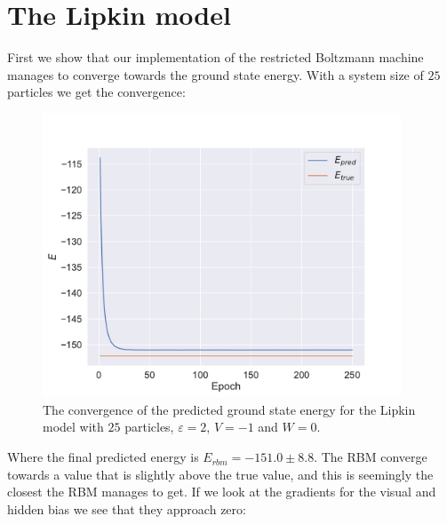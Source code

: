 \section{The Lipkin model}

First we show that our implementation of the restricted Boltzmann machine manages to converge towards the ground state energy. With a system size of $25$ particles we get the convergence:

\begin{figure}[H]
  \begin{center}
    \includegraphics[width=0.95\textwidth]{Figures/Plots/Lipkin/Result25conv.pdf}
  \end{center}
  \caption{The convergence of the predicted ground state energy for the Lipkin model with $25$ particles, $\varepsilon = 2$, $V = -1$ and $W=0$.}\label{fig:res25conv}
\end{figure}

Where the final predicted energy is $E_{rbm} = -151.0 \pm 8.8$. The RBM converge towards a value that is slightly above the true value, and this is seemingly the closest the RBM manages to get. If we look at the gradients for the visual and hidden bias we see that they approach zero:


